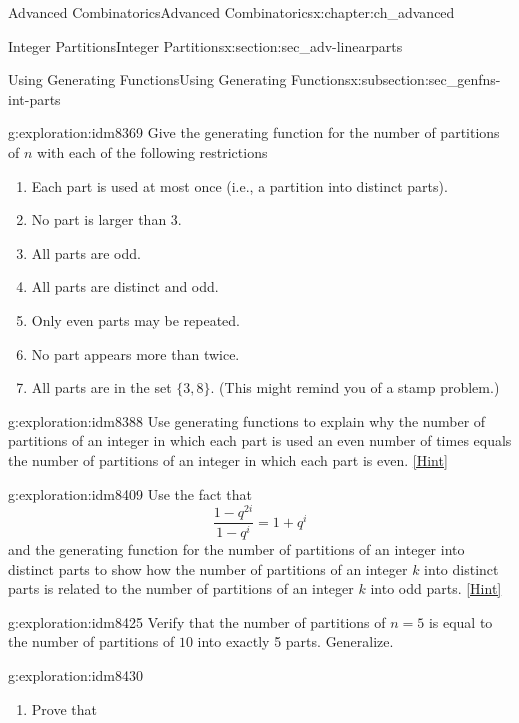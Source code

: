 \documentclass[oneside,10pt,]{book}
\numberwithin{equation}{chapter}
\begin{document}
\begin{chapterptx}{Advanced Combinatorics}{}{Advanced Combinatorics}{}{}{x:chapter:ch_advanced}
\begin{sectionptx}{Integer Partitions}{}{Integer Partitions}{}{}{x:section:sec_adv-linearparts}
\begin{subsectionptx}{Using Generating Functions}{}{Using Generating Functions}{}{}{x:subsection:sec_genfns-int-parts}
\begin{exploration}{}{g:exploration:idm8369}
Give the generating function for the number of partitions of \(n\) with each of the following restrictions%
\begin{enumerate}[font=\bfseries,label=(\alph*),ref=\alph*]
\item{}Each part is used at most once (i.e., a partition into distinct parts).%
\item{}No part is larger than 3.%
\item{}All parts are odd.%
\item{}All parts are distinct and odd.%
\item{}Only even parts may be repeated.%
\item{}No part appears more than twice.%
\item{}All parts are in the set \(\{3,8\}\).  (This might remind you of a stamp problem.)%
\end{enumerate}
\end{exploration}
\begin{exploration}{}{g:exploration:idm8388}%
Use generating functions to explain why the number of partitions of an integer in which each part is used an even number of times equals the number of partitions of an integer in which each part is even.%
\space\hspace*{0pt}\hfill{\tiny\hyperlink{g:hint:idm8391-back}{[Hint]}}\end{exploration}
\begin{exploration}{}{g:exploration:idm8409}%
Use the fact that%
\begin{equation*}
\frac{1-q^{2i}}{1-q^i}= 1+q^i
\end{equation*}
and the generating function for the number of partitions of an integer into distinct parts to show how the number of partitions of an integer \(k\) into distinct parts is related to the number of partitions of an integer \(k\) into odd parts.%
\space\hspace*{0pt}\hfill{\tiny\hyperlink{g:hint:idm8415-back}{[Hint]}}\end{exploration}
\begin{exploration}{}{g:exploration:idm8425}%
Verify that the number of partitions of \(n=5\) is equal to the number of partitions of \(10\) into exactly 5 parts.  Generalize.%
\end{exploration}
\begin{exploration}{}{g:exploration:idm8430}%
\begin{enumerate}[font=\bfseries,label=(\alph*),ref=\alph*]
\item{}Prove that%
\begin{equation*}

\end{equation*}
\end{enumerate}
\end{exploration}
\end{subsectionptx}
\end{sectionptx}
\end{chapterptx}
\end{document}
